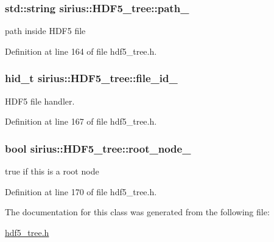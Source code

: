 \subsubsection[{path\+\_\+}]{\setlength{\rightskip}{0pt plus 5cm}std\+::string sirius\+::\+H\+D\+F5\+\_\+tree\+::path\+\_\+\hspace{0.3cm}{\ttfamily [private]}}\label{classsirius_1_1_h_d_f5__tree_ad1acd4df53bdef0edb7ab9d69d63ff80}


path inside H\+D\+F5 file 



Definition at line 164 of file hdf5\+\_\+tree.\+h.

\hypertarget{classsirius_1_1_h_d_f5__tree_a1be4776a9d6b2858a8f083878367b3ac}{}
\subsubsection[{file\+\_\+id\+\_\+}]{\setlength{\rightskip}{0pt plus 5cm}hid\+\_\+t sirius\+::\+H\+D\+F5\+\_\+tree\+::file\+\_\+id\+\_\+\hspace{0.3cm}{\ttfamily [private]}}\label{classsirius_1_1_h_d_f5__tree_a1be4776a9d6b2858a8f083878367b3ac}


H\+D\+F5 file handler. 



Definition at line 167 of file hdf5\+\_\+tree.\+h.

\hypertarget{classsirius_1_1_h_d_f5__tree_a5d07fadfbcafa38b174c32fb0700aeef}{}
\subsubsection[{root\+\_\+node\+\_\+}]{\setlength{\rightskip}{0pt plus 5cm}bool sirius\+::\+H\+D\+F5\+\_\+tree\+::root\+\_\+node\+\_\+\hspace{0.3cm}{\ttfamily [private]}}\label{classsirius_1_1_h_d_f5__tree_a5d07fadfbcafa38b174c32fb0700aeef}


true if this is a root node 



Definition at line 170 of file hdf5\+\_\+tree.\+h.



The documentation for this class was generated from the following file\+:\begin{DoxyCompactItemize}
\item 
\hyperlink{hdf5__tree_8h}{hdf5\+\_\+tree.\+h}\end{DoxyCompactItemize}
